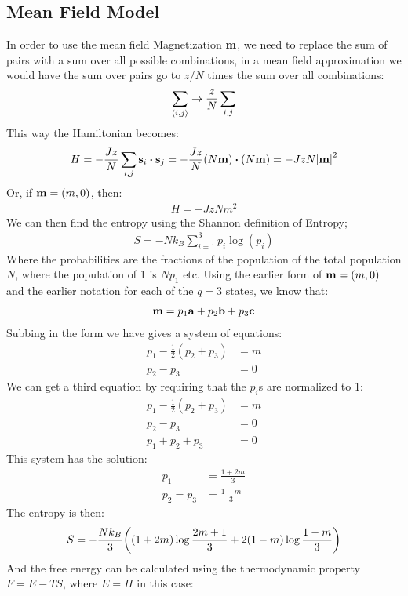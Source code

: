 \subsection{Mean Field Model}
In order to use the mean field Magnetization $\vb{m}$, we need to replace the sum of pairs with a sum over all possible combinations, in a mean field approximation we would have the sum over pairs go to $z/N$ times the sum over all combinations:
\begin{align*}
  \sum_{\ev{i,j}}\to\frac{z}{N}\sum_{i,j}
\end{align*}
This way the Hamiltonian becomes:
\begin{align*}
  H=-\frac{Jz}{N}\sum_{i,j}\vb{s}_i\vdot\vb{s}_j=
  -\frac{Jz}{N}(N\vb{m})\vdot(N\vb{m})=-JzN\abs{\vb{m}}^2
\end{align*}
Or, if $\vb{m}=(m,0)$, then:
\begin{align*}
  H=-JzNm^2
\end{align*}
We can then find the entropy using the Shannon definition of Entropy;
\begin{align*}
  S=-Nk_B\sum_{i=1}^3p_i\log(p_i)
\end{align*}
Where the probabilities are the fractions of the population of the total population $N$, where the population of 1 is $Np_1$ etc. Using the earlier form of $\vb{m}=(m,0)$ and the earlier notation for each of the $q=3$ states, we know that:
\begin{align*}
  \vb{m}= p_1\vb{a}+p_2\vb{b}+p_3\vb{c}
\end{align*}
Subbing in the form we have gives a system of equations:
\begin{align*}
  p_1-\frac12(p_2+p_3)&=m\\
  p_2-p_3&=0
\end{align*}
We can get a third equation by requiring that the $p_i$s are normalized to 1:
\begin{align*}
  p_1-\frac12(p_2+p_3)&=m\\
  p_2-p_3&=0\\
  p_1+p_2+p_3&=0
\end{align*}
This system has the solution:
\begin{align*}
  p_1&=\frac{1+2m}{3}\\
  p_2=p_3&=\frac{1-m}{3}
\end{align*}
The entropy is then:
\begin{align*}
  S=-\frac{Nk_B}{3}\qty((1+2m)\log\frac{2m+1}{3}+2(1-m)\log\frac{1-m}{3})
\end{align*}
And the free energy can be calculated using the thermodynamic property $F=E-TS$, where $E=H$ in this case:
